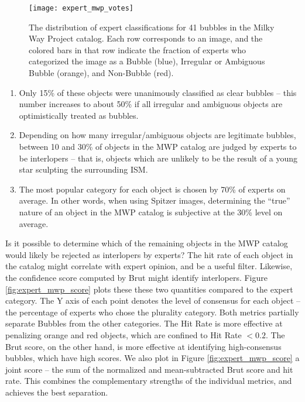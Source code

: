 \documentclass[preprint]{aastex}
\begin{document}
\begin{figure}
\texttt{[image: expert\_mwp\_votes]}
\caption{The distribution of expert classifications for 41 bubbles in the Milky Way Project catalog. Each row corresponds to an image, and the colored bars in that row indicate the fraction of experts who categorized the image as a Bubble (blue), Irregular or Ambiguous Bubble (orange), and Non-Bubble (red).}
\label{fig:expert_mwp_votes}
\end{figure}

\begin{enumerate} 
\item Only 15\% of these objects were unanimously classified as clear bubbles -- this number increases to about 50\% if all irregular and ambiguous objects are optimistically treated as bubbles. 
\item Depending on how many irregular/ambiguous objects are legitimate bubbles, between 10 and 30\% of objects in the MWP catalog are judged by experts to be interlopers -- that is, objects which are unlikely to be the result of a young star sculpting the surrounding ISM.
\item The most popular category for each object is chosen by 70\% of experts on average. In other words, when using Spitzer images, determining the ``true'' nature of an object in the MWP catalog is subjective at the 30\% level on average.
\end{enumerate}


Is it possible to determine which of the remaining objects in the MWP catalog would likely be rejected as interlopers by experts? The hit rate of each object in the catalog might correlate with expert opinion, and be a useful filter. Likewise, the confidence score computed by Brut might identify interlopers. Figure \ref{fig:expert_mwp_score} plots these these two quantities compared to the expert category. The Y axis of each point denotes the level of consensus for each object -- the percentage of experts who chose the plurality category. Both metrics partially separate Bubbles from the other categories. The Hit Rate is more effective at penalizing orange and red objects, which are confined to Hit Rate $<0.2$. The Brut score, on the other hand, is more effective at identifying high-consensus bubbles, which have high scores. We also plot in Figure \ref{fig:expert_mwp_score} a joint score -- the sum of the normalized and mean-subtracted Brut score and hit rate.  This combines the complementary strengths of the individual metrics, and achieves the best separation.
\end{document}
